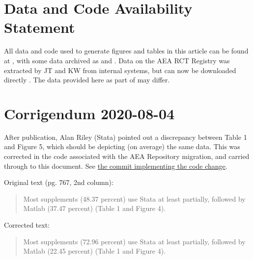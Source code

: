 \documentclass[PP]{AEA}
\begin{document}
\section{Data and Code Availability Statement}
\label{sec:dcas}

All data and code used to generate figures and tables in this article can be found at \citet{E117884V1}, with some data archived as \citet{E117873V1} and \citet{E117876V1}. Data on the AEA RCT Registry was extracted by JT and KW from internal systems, but can now be downloaded directly \citep{DVN/DFMLIU_2020}. The data provided here as part of \citet{E117884V1} may differ.

\FloatBarrier
%
%



\appendix



\clearpage

\section*{Corrigendum 2020-08-04}

After publication, Alan Riley (Stata) pointed out a discrepancy between Table 1 and Figure 5, which should be depicting (on average) the same data. This was corrected in the code associated with the AEA Repository migration, and carried through to this document. See \href{https://github.com/AEADataEditor/aea-supplement-migration/commit/530f1e9ad8059e68815b5836db33155c990154b0}{the commit implementing the code change}.

Original text (pg. 767, 2nd column):
\begin{quote}
Most supplements (48.37 percent) use Stata at least partially, followed by
Matlab (37.47 percent) (Table 1 and Figure 4).
\end{quote}

Corrected text:
\begin{quote}
Most supplements (72.96 percent) use Stata at least partially, followed by
Matlab (22.45 percent) (Table 1 and Figure 4).
\end{quote}
\end{document}
